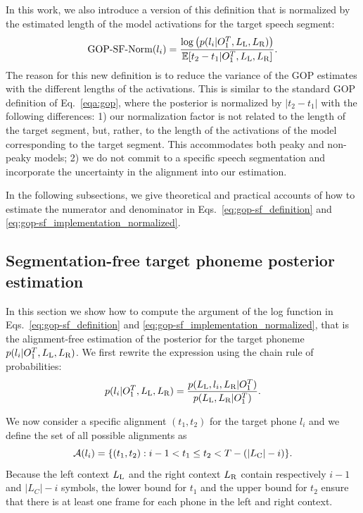 In this work, we also introduce a version of this definition that is normalized by the estimated length of the model activations for the target speech segment:
\begin{equation}
    \text{GOP-SF-Norm}(l_i) = \frac{\log\left(p(l_i|O_1^T, L_{\text{L}}, L_{\text{R}})\right)}{\mathbb{E}[t_2-t_1|O_1^T, L_{\text{L}}, L_{\text{R}}]}.
    \label{eq:gop-sf_implementation_normalized}
\end{equation}
The reason for this new definition is to reduce the variance of the GOP estimates with the different lengths of the activations.
This is similar to the standard GOP definition of Eq.~\ref{eqa:gop}, where the posterior is normalized by $|t_2-t_1|$ with the following differences: 1) our normalization factor is not related to the length of the target segment, but, rather, to the length of the activations of the model corresponding to the target segment. This accommodates both peaky and non-peaky models; 2) we do not commit to a specific speech segmentation and incorporate the uncertainty in the alignment into our estimation.

In the following subsections, we give theoretical and practical accounts of how to estimate the numerator and denominator in Eqs.~\ref{eq:gop-sf_definition} and \ref{eq:gop-sf_implementation_normalized}.
\subsection{Segmentation-free target phoneme posterior estimation}
\label{sec:alignment-free_posterior_estimation}
In this section we show how to compute the argument of the log function in Eqs.~\ref{eq:gop-sf_definition} and \ref{eq:gop-sf_implementation_normalized}, that is the alignment-free estimation of the posterior for the target phoneme $p(l_i|O_1^T, L_{\text{L}}, L_{\text{R}})$.
We first rewrite the expression using the chain rule of probabilities:
\begin{equation}
   p(l_i|O_1^T, L_{\text{L}}, L_{\text{R}}) = \frac{ p(L_{\text{L}}, l_i, L_{\text{R}}|O_1^T)}{p(L_{\text{L}}, L_{\text{R}}|O_1^T)}.
   \label{eq:gop-sf_first_expansion}
\end{equation}

We now consider a specific alignment $(t_1, t_2)$ for the target phone $l_i$ and we define the set of all possible alignments as
\begin{equation}
    \mathcal{A}(l_i)=\{(t_1,t_2): i-1 < t_1 \leq t_2 < T-(|L_{\text{C}}|-i)\}.
\end{equation}
Because the left context $L_{\text{L}}$ and the right context $L_{\text{R}}$ contain respectively $i-1$ and $|L_C|-i$ symbols, 
the lower bound for $t_1$ and the upper bound for $t_2$ ensure that there is at least one frame for each phone in the left and right context.

